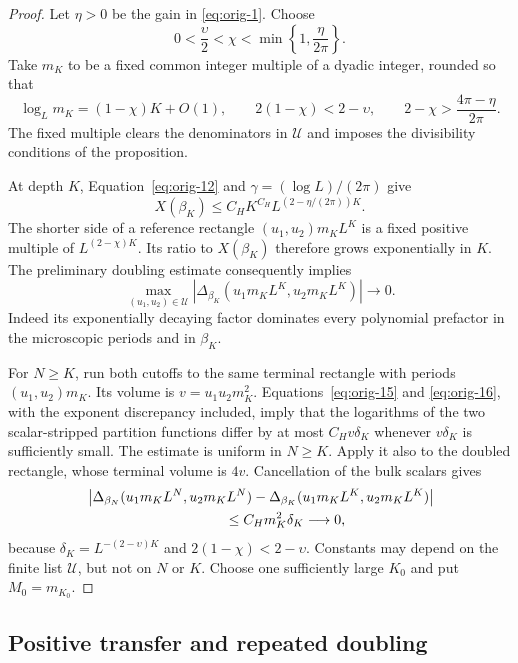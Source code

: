 \begin{proof}
Let $\eta>0$ be the gain in \eqref{eq:orig-1}.  Choose
\[
 0<\frac{\upsilon}{2}<\chi<\min\left\{1,\frac{\eta}{2\pi}\right\}.
\]
Take $m_K$ to be a fixed common integer multiple of a dyadic integer,
rounded so that
\begin{equation}
 \log_L m_K=(1-\chi)K+O(1),\qquad
 2(1-\chi)<2-\upsilon,\qquad
 2-\chi>\frac{4\pi-\eta}{2\pi}.
 \label{eq:trace-scale-choice}
\end{equation}
The fixed multiple clears the denominators in $\mathcal U$ and imposes
the divisibility conditions of the proposition.

At depth $K$, Equation~\eqref{eq:orig-12} and
$\gamma=(\log L)/(2\pi)$ give
\[
 X(\beta_K)
   \le C_H K^{C_H} L^{(2-\eta/(2\pi))K}.
\]
The shorter side of a reference rectangle
$(u_1,u_2)m_KL^K$ is a fixed positive multiple of
$L^{(2-\chi)K}$.  Its ratio to $X(\beta_K)$ therefore grows
exponentially in $K$.  The preliminary doubling estimate consequently
implies
\[
 \max_{(u_1,u_2)\in\mathcal U}
 \left|\Delta_{\beta_K}(u_1m_KL^K,u_2m_KL^K)\right|
     \longrightarrow0.
\]
Indeed its exponentially decaying factor dominates every polynomial
prefactor in the microscopic periods and in $\beta_K$.

For $N\ge K$, run both cutoffs to the same terminal rectangle with
periods $(u_1,u_2)m_K$.  Its volume is
$v=u_1u_2m_K^2$.  Equations~\eqref{eq:orig-15} and
\eqref{eq:orig-16}, with the exponent discrepancy included, imply
that the logarithms of the two scalar-stripped partition functions
differ by at most $C_Hv\delta_K$ whenever $v\delta_K$ is sufficiently
small.  The estimate is uniform in $N\ge K$.  Apply it also to the
doubled rectangle, whose terminal volume is $4v$.  Cancellation of the
bulk scalars gives
\begin{align*}
 &\left|\Delta_{\beta_N}(u_1m_KL^N,u_2m_KL^N)
       -\Delta_{\beta_K}(u_1m_KL^K,u_2m_KL^K)\right|\\
 &\hspace{35mm}\le C_Hm_K^2\delta_K
       \longrightarrow0,
\end{align*}
because $\delta_K=L^{-(2-\upsilon)K}$ and
$2(1-\chi)<2-\upsilon$.  Constants may depend on the finite list
$\mathcal U$, but not on $N$ or $K$.  Choose one sufficiently large
$K_0$ and put $M_0=m_{K_0}$.
\end{proof}

\subsection{Positive transfer and repeated doubling}

